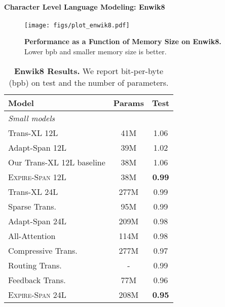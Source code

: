 \paragraph{Character Level Language Modeling: Enwik8} 

\begin{figure}[t]
    \centering
    \texttt{[image: figs/plot\_enwik8.pdf]}
    \caption{\textbf{Performance as a Function of Memory Size on Enwik8.} Lower bpb and smaller memory size is better.}
    \label{fig:enwik8_span}
\end{figure}

\begin{table}[t]
\setlength{\tabcolsep}{2.0pt}
    \centering
    \begin{tabular}{lcc}
    \toprule
    Model & Params & Test \\
    \midrule
    \multicolumn{3}{l}{\small\emph{Small models}} \\
    Trans-XL 12L~{\footnotesize {\citep{dai2019transformer}}} & 41M  & 1.06 \\
    Adapt-Span 12L~{\footnotesize {\citep{sukhbaatar2019adaptive}}} & 39M & 1.02 \\
    Our Trans-XL 12L baseline & 38M  & 1.06 \\
    \textsc{Expire-Span} 12L & 38M & \bf 0.99 \\ 
    \midrule
    Trans-XL 24L~{\footnotesize {\citep{dai2019transformer}}} & 277M  & 0.99 \\
    Sparse Trans.~{\footnotesize {\citep{child2019generating}}} & 95M  & 0.99 \\
    Adapt-Span 24L~{\footnotesize {\citep{sukhbaatar2019adaptive}}} & 209M & 0.98 \\
    All-Attention~{\footnotesize {\citep{sukhbaatar2019augmenting}}} & 114M  & 0.98 \\
    Compressive Trans.~{\footnotesize {\citep{rae2020compressive}}} & 277M  & 0.97 \\
    Routing Trans.~{\footnotesize {\citep{roy2020efficient}}}& - & 0.99 \\ 
    Feedback Trans.~{\footnotesize {\citep{fan2020accessing}}} & 77M &  0.96 \\    
    \textsc{Expire-Span} 24L & 208M &  \bf 0.95 \\
\bottomrule
    \end{tabular}
    \caption{
    \textbf{Enwik8 Results.} We report bit-per-byte (bpb) on test and the number of parameters.
    }
    \label{tab:enwik8}
\end{table}

